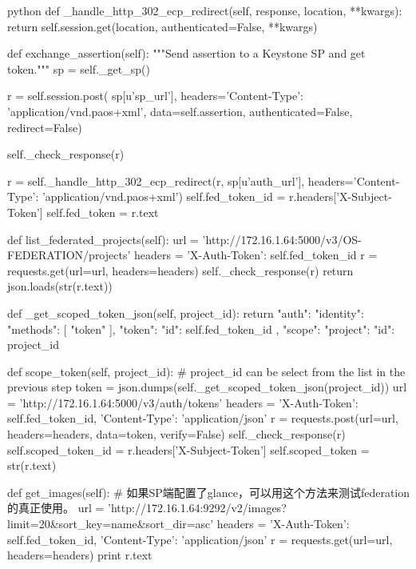 \begin{code-block}{python}
    def _handle_http_302_ecp_redirect(self, response, location, **kwargs):
        return self.session.get(location, authenticated=False, **kwargs)

    def exchange_assertion(self):
        """Send assertion to a Keystone SP and get token."""
        sp = self._get_sp()

        r = self.session.post(
            sp[u'sp_url'],
            headers={'Content-Type': 'application/vnd.paos+xml'},
            data=self.assertion,
            authenticated=False,
            redirect=False)

        self._check_response(r)

        r = self._handle_http_302_ecp_redirect(r, sp[u'auth_url'],
                                               headers={'Content-Type':
                                               'application/vnd.paos+xml'})
        self.fed_token_id = r.headers['X-Subject-Token']
        self.fed_token = r.text

    def list_federated_projects(self):
        url = 'http://172.16.1.64:5000/v3/OS-FEDERATION/projects'
        headers = {'X-Auth-Token': self.fed_token_id}
        r = requests.get(url=url, headers=headers)
        self._check_response(r)
        return json.loads(str(r.text))

    def _get_scoped_token_json(self, project_id):
        return {
            "auth": {
                "identity": {
                    "methods": [
                        "token"
                    ],
                    "token": {
                        "id": self.fed_token_id
                    }
                },
                "scope": {
                    "project": {
                        "id": project_id
                    }
                }
            }
        }

    def scope_token(self, project_id):
        # project_id can be select from the list in the previous step
        token = json.dumps(self._get_scoped_token_json(project_id))
        url = 'http://172.16.1.64:5000/v3/auth/tokens'
        headers = {'X-Auth-Token': self.fed_token_id,
                   'Content-Type': 'application/json'}
        r = requests.post(url=url, headers=headers, data=token,
                          verify=False)
        self._check_response(r)
        self.scoped_token_id = r.headers['X-Subject-Token']
        self.scoped_token = str(r.text)

    def get_images(self):
        # 如果SP端配置了glance，可以用这个方法来测试federation的真正使用。
        url = 'http://172.16.1.64:9292/v2/images?limit=20&sort_key=name&sort_dir=asc'
        headers = {'X-Auth-Token': self.fed_token_id,
                   'Content-Type': 'application/json'}
        r = requests.get(url=url, headers=headers)
        print r.text



\end{code-block}
